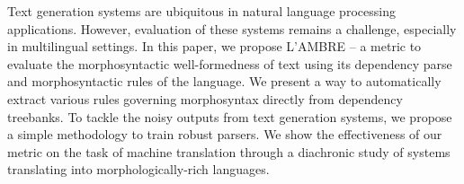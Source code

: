 Text generation systems are ubiquitous in natural language processing applications. However, evaluation of these systems remains a challenge, especially in multilingual settings. In this paper, we propose L'AMBRE -- a metric to evaluate the morphosyntactic well-formedness of text using its dependency parse and morphosyntactic rules of the language. We present a way to automatically extract various rules governing morphosyntax directly from dependency treebanks. To tackle the noisy outputs from text generation systems, we propose a simple methodology to train robust parsers. We show the effectiveness of our metric on the task of machine translation through a diachronic study of systems translating into morphologically-rich languages.

